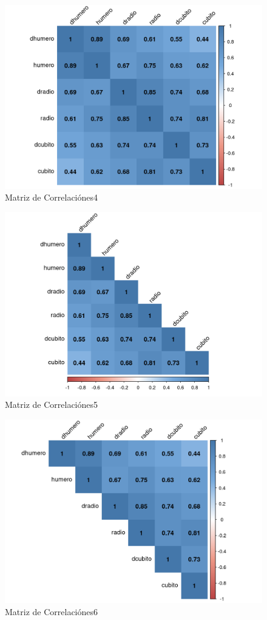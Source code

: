 \documentclass[12pt,a4paper,]{book}
\numberwithin{dummy}{section}
\theoremstyle{ocrenumbox}
\theoremstyle{ocrenumbox}
\theoremstyle{ocrenumbox}
\theoremstyle{ocrenumbox}
\theoremstyle{ocrenum}
\begin{document}
\begin{figure}[H]

{\centering \includegraphics[width=0.6\linewidth]{figurasR/grafica1l-1} 

}

\caption{Matriz de Correlaciónes4}\label{fig:grafica1l}
\end{figure}

\begin{figure}[H]

{\centering \includegraphics[width=0.6\linewidth]{figurasR/grafica1m-1} 

}

\caption{Matriz de Correlaciónes5}\label{fig:grafica1m}
\end{figure}

\begin{figure}[H]

{\centering \includegraphics[width=0.6\linewidth]{figurasR/grafica1n-1} 

}

\caption{Matriz de Correlaciónes6}\label{fig:grafica1n}
\end{figure}
\end{document}
